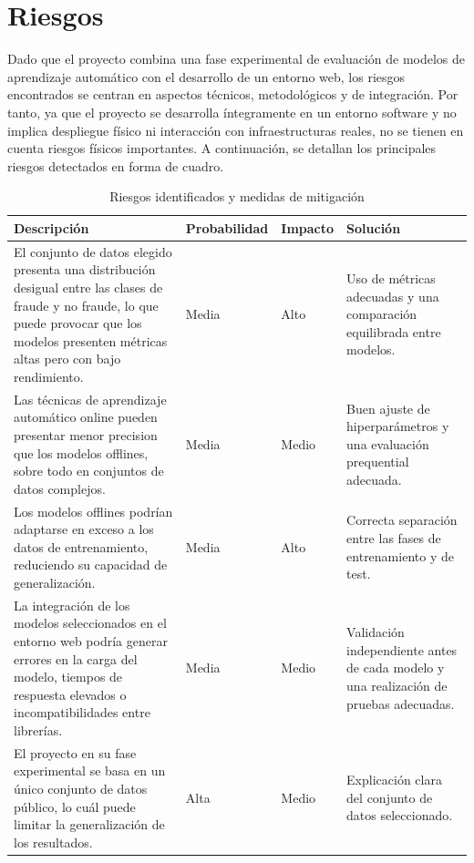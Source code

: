 \documentclass[12pt,a4paper]{report}
\begin{document}
\section{Riesgos}

Dado que el proyecto combina una fase experimental de evaluación de modelos de aprendizaje automático con el desarrollo de un entorno web, los riesgos encontrados se centran en aspectos técnicos, metodológicos y de integración. Por tanto, ya que el proyecto se desarrolla íntegramente en un entorno software y no implica despliegue físico ni interacción con infraestructuras reales, no se tienen en cuenta riesgos físicos importantes. A continuación, se detallan los principales riesgos detectados en forma de cuadro.

\begin{table}[H]
\centering
\begin{tabular}{|p{5cm}|p{2.5cm}|p{2.5cm}|p{5cm}|}
\hline
\textbf{Descripción} & \textbf{Probabilidad} & \textbf{Impacto} & \textbf{Solución} \\
\hline

El conjunto de datos elegido presenta una distribución desigual entre las clases de fraude y no fraude, lo que puede provocar que los modelos presenten métricas altas pero con bajo rendimiento. 
& Media & Alto 
& Uso de métricas adecuadas y una comparación equilibrada entre modelos. \\
\hline

Las técnicas de aprendizaje automático online pueden presentar menor precision que los modelos offlines, sobre todo en conjuntos de datos complejos. 
& Media & Medio 
& Buen ajuste de hiperparámetros y una evaluación prequential adecuada. \\
\hline

Los modelos offlines podrían adaptarse en exceso a los datos de entrenamiento, reduciendo su capacidad de generalización. 
& Media & Alto 
& Correcta separación entre las fases de entrenamiento y de test. \\
\hline

La integración de los modelos seleccionados en el entorno web podría generar errores en la carga del modelo, tiempos de respuesta elevados o incompatibilidades entre librerías. 
& Media & Medio 
& Validación independiente antes de cada modelo y una realización de pruebas adecuadas. \\
\hline

El proyecto en su fase experimental se basa en un único conjunto de datos público, lo cuál puede limitar la generalización de los resultados. 
& Alta & Medio 
& Explicación clara del conjunto de datos seleccionado. \\
\hline

\end{tabular}
\caption{Riesgos identificados y medidas de mitigación}
\end{table}
\end{document}
